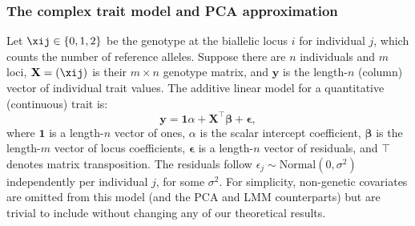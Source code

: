 \documentclass[11pt]{article}
\begin{document}
\subsubsection{The complex trait model and PCA approximation}

Let $\xij \in \{ 0, 1, 2 \}$ be the genotype at the biallelic locus $i$ for individual $j$, which counts the number of reference alleles.
Suppose there are $n$ individuals and $m$ loci,
$\mathbf{X} = ( \xij )$ is their $m \times n$ genotype matrix, and
$\mathbf{y}$ is the length-$n$ (column) vector of individual trait values.
The additive linear model for a quantitative (continuous) trait is:
\begin{equation}
  \label{eq:trait}
  \mathbf{y}
  =
  \mathbf{1} \alpha + \mathbf{X}^\intercal \boldsymbol{\beta} + \boldsymbol{\epsilon}
  ,
\end{equation}
where
$\mathbf{1}$ is a length-$n$ vector of ones,
$\alpha$ is the scalar intercept coefficient,
$\boldsymbol{\beta}$ is the length-$m$ vector of locus coefficients,
$\boldsymbol{\epsilon}$ is a length-$n$ vector of residuals,
and $\intercal$ denotes matrix transposition.
The residuals follow $\epsilon_j \sim \text{Normal}(0, \sigma^2)$ independently per individual $j$, for some $\sigma^2$.
For simplicity, non-genetic covariates are omitted from this model (and the PCA and LMM counterparts) but are trivial to include without changing any of our theoretical results.
\end{document}
